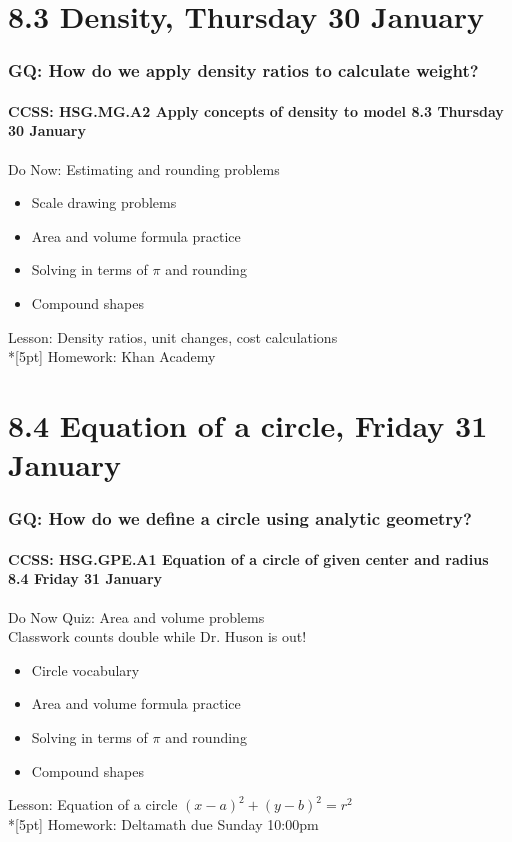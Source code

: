\documentclass{beamer}
\begin{document}
\section{8.3 Density, Thursday 30 January}
\frame
{
  \frametitle{GQ: How do we apply density ratios to calculate weight?}
  \framesubtitle{CCSS: HSG.MG.A2 Apply concepts of density to model \hfill \alert{8.3 Thursday 30 January}}

  \begin{block}{Do Now: Estimating and rounding problems}
  \begin{itemize}
    \item Scale drawing problems
    \item Area and volume formula practice
    \item Solving in terms of $\pi$ and rounding
    \item Compound shapes
  \end{itemize}
  \end{block}
  Lesson: Density ratios, unit changes, cost calculations\\*[5pt]
  Homework: Khan Academy
}

\section{8.4 Equation of a circle, Friday 31 January}
\frame
{
  \frametitle{GQ: How do we define a circle using analytic geometry?}
  \framesubtitle{CCSS: HSG.GPE.A1 Equation of a circle of given center and radius \hfill \alert{8.4 Friday 31 January}}

  \begin{block}{Do Now Quiz: Area and volume problems\\[0.25cm]
    \alert{Classwork counts double while Dr. Huson is out!}}
  \begin{itemize}
    \item Circle vocabulary
    \item Area and volume formula practice
    \item Solving in terms of $\pi$ and rounding
    \item Compound shapes
  \end{itemize}
  \end{block}
  Lesson: Equation of a circle $(x-a)^2+(y-b)^2=r^2$\\*[5pt]
  Homework: Deltamath due Sunday 10:00pm
}
\end{document}
